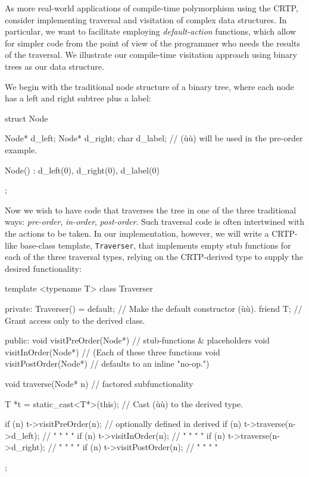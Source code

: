 As more real-world applications of compile-time polymorphism using the CRTP,
consider implementing traversal and visitation of complex data
structures. In particular, we want to facilitate employing
\emph{default-action} functions, which allow for simpler code from the
point of view of the programmer who needs the results of the traversal.
We illustrate our compile-time visitation approach using binary trees as
our data structure.

We begin with the traditional node structure of a binary tree, where
each node has a left and right subtree plus a label:

\begin{emcppslisting}[emcppsbatch=e9]
struct Node
{
    Node* d_left;
    Node* d_right;
    char  d_label;  // (ù{}ù) will be used in the pre-order example.

    Node() : d_left(0), d_right(0), d_label(0) { }
};
\end{emcppslisting}
    
\noindent Now we wish to have code that traverses the tree in one of the three
traditional ways: \emph{pre-order}, \emph{in-order}, \emph{post-order}.
Such traversal code is often intertwined with the actions to be taken.
In our implementation, however, we will write a CRTP-like base-class
template, \lstinline!Traverser!, that implements empty stub functions for
each of the three traversal types, relying on the CRTP-derived
type to supply the desired functionality:

\begin{emcppslisting}[emcppsbatch=e9]
template <typename T>
class Traverser
{
private:
    Traverser() = default;  // Make the default constructor (ù{}ù).
    friend T;               // Grant access only to the derived class.

public:
    void visitPreOrder(Node*)  { }  // stub-functions & placeholders
    void visitInOrder(Node*)   { }  // (Each of these three functions
    void visitPostOrder(Node*) { }  // defaults to an inline "no-op.")

    void traverse(Node* n)  // factored subfunctionality
    {
        T *t = static_cast<T*>(this);  // Cast (ù{}ù) to the derived type.

        if (n) { t->visitPreOrder(n);     }  // optionally defined in derived
        if (n) { t->traverse(n->d_left);  }  //     "         "    "     "
        if (n) { t->visitInOrder(n);      }  //     "         "    "     "
        if (n) { t->traverse(n->d_right); }  //     "         "    "     "
        if (n) { t->visitPostOrder(n);    }  //     "         "    "     "
    }
};
\end{emcppslisting}
    
